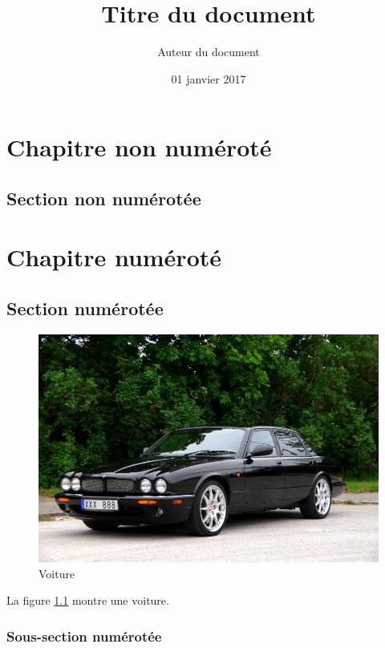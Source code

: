 \documentclass[a4paper,12pt]{report}
\begin{document}

\title{Titre du document}
\date{01 janvier 2017}
\author{Auteur du document}
	
\maketitle

\tableofcontents
\listoffigures

\pagestyle{fancy}
\chapter*{Chapitre non numéroté}
\lipsum

\section*{Section non numérotée}
\lipsum

\chapter{Chapitre numéroté}
\lipsum

\section{Section numérotée}
\lipsum

\begin{figure}
	\centering
	\includegraphics[width=1.0\textwidth]{images/xjr.jpg}
	\caption{Voiture}
	\label{fig:xjr}
\end{figure}

La figure \ref{fig:xjr} montre une voiture.


\subsection{Sous-section numérotée}
\lipsum
\end{document}
